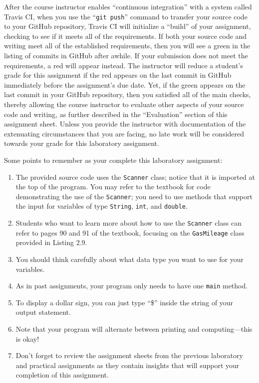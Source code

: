 \documentclass[11pt]{article}
\newcommand{\gitpush}{\command{git push}}
\newcommand{\command}[1]{``\lstinline{#1}''}
\newcommand{\step}[1]{``{#1}''}
\newcommand{\checkmark}{\ding{51}}
\newcommand{\naughtmark}{\ding{55}}
\begin{document}
After the course instructor enables \step{continuous integration} with a system called Travis CI, when you use the
\gitpush{} command to transfer your source code to your GitHub repository, Travis CI will initialize a \step{build} of
your assignment, checking to see if it meets all of the requirements. If both your source code and writing meet all of
the established requirements, then you will see a green \checkmark{} in the listing of commits in GitHub after awhile.
If your submission does not meet the requirements, a red \naughtmark{} will appear instead. The instructor will reduce a
student's grade for this assignment if the red \naughtmark{} appears on the last commit in GitHub immediately before the
assignment's due date. Yet, if the green \checkmark{} appears on the last commit in your GitHub repository, then you
satisfied all of the main checks, thereby allowing the course instructor to evaluate other aspects of your source code
and writing, as further described in the \step{Evaluation} section of this assignment sheet. Unless you provide the
instructor with documentation of the extenuating circumstances that you are facing, no late work will be considered
towards your grade for this laboratory assignment.

Some points to remember as your complete this laboratory assignment:

\begin{enumerate}
  \setlength{\itemsep}{0pt}

\item The provided source code uses the {\tt Scanner} class; notice that it is imported at the top of the program. You
  may refer to the textbook for code demonstrating the use of the {\tt Scanner}; you need to use methods that support
  the input for variables of type {\tt String}, {\tt int}, and {\tt double}.

\item Students who want to learn more about how to use the {\tt Scanner} class can refer to pages 90 and 91 of the
  textbook, focusing on the {\tt GasMileage} class provided in Listing 2.9.

\item You should think carefully about what data type you want to use for your variables.

\item As in past assignments, your program only needs to have one {\tt main} method.

\item To display a dollar sign, you can just type ``\$'' inside the string of your output statement.

\item Note that your program will alternate between printing and computing---this
is okay!

\item Don't forget to review the assignment sheets from the previous laboratory and practical assignments as they
  contain insights that will support your completion of this assignment.

\end{enumerate}
\end{document}
